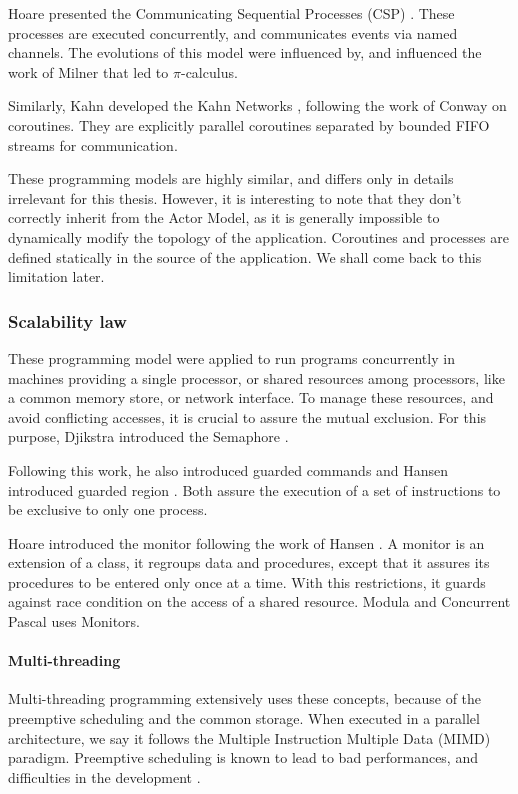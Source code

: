 Hoare presented the Communicating Sequential Processes (CSP) \cite{Hoare1978, Brookes1984}.
These processes are executed concurrently, and communicates events via named channels.
The evolutions of this model were influenced by, and influenced the work of Milner that led to $\pi$-calculus.

Similarly, Kahn developed the Kahn Networks \cite{Kahn1974, Kahn1976}, following the work of Conway on coroutines.
They are explicitly parallel coroutines separated by bounded FIFO streams for communication.

These programming models are highly similar, and differs only in details irrelevant for this thesis.
However, it is interesting to note that they don't correctly inherit from the Actor Model, as it is generally impossible to dynamically modify the topology of the application.
Coroutines and processes are defined statically in the source of the application.
We shall come back to this limitation later.

\subsubsection{Scalability law}

These programming model were applied to run programs concurrently in machines providing a single processor, or shared resources among processors, like a common memory store, or network interface.
To manage these resources, and avoid conflicting accesses, it is crucial to assure the mutual exclusion.
For this purpose, Djikstra introduced the Semaphore \cite{Dijkstra}.

Following this work, he also introduced guarded commands \cite{Dijkstra1975} and Hansen introduced guarded region \cite{Hansen1978a}.
Both assure the execution of a set of instructions to be exclusive to only one process.

Hoare introduced the monitor following the work of Hansen \cite{Hoare1974}.
A monitor is an extension of a class, it regroups data and procedures, except that it assures its procedures to be entered only once at a time.
With this restrictions, it guards against race condition on the access of a shared resource.
Modula \cite{Wirth1977} and Concurrent Pascal \cite{Hansen1975} uses Monitors.

\paragraph{Multi-threading}

Multi-threading programming extensively uses these concepts, because of the preemptive scheduling and the common storage.
When executed in a parallel architecture, we say it follows the Multiple Instruction Multiple Data (MIMD) paradigm.
Preemptive scheduling is known to lead to bad performances, and difficulties in the development \cite{Adya2002}.

